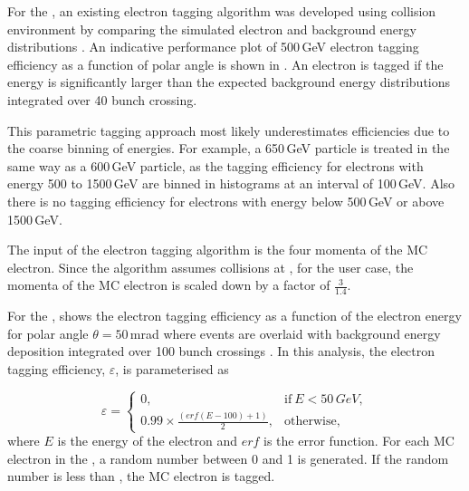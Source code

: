 For the \BeamCAL, an existing electron tagging algorithm was developed using  collision environment by comparing the simulated electron and background energy distributions \cite{Sailer:2017onh}. An indicative performance plot of 500\,GeV electron tagging efficiency as a function of polar angle is shown in . An electron is tagged if the energy is significantly larger than the expected background energy distributions integrated over 40 bunch crossing.

This parametric tagging approach  most likely underestimates efficiencies due to the coarse binning of energies. For example,  a 650\,GeV particle is treated in the same way as a 600\,GeV particle, as the tagging efficiency for electrons with energy 500 to 1500\,GeV are binned in histograms at an interval of 100\,GeV. Also there is no tagging efficiency for electrons with energy below 500\,GeV or above 1500\,GeV.



The input of the \BeamCAL electron tagging algorithm is the four momenta of the MC electron. Since the algorithm assumes collisions at , for the  user case, the momenta of the MC electron is scaled down by a factor of $\frac{3}{1.4}$.



For the \LumiCAL,   shows the \LumiCAL  electron tagging efficiency as a function of the electron energy for polar angle $\theta = 50$\,mrad where events are overlaid with background energy deposition integrated over 100 bunch crossings \cite{Lukic:forwardElectron}. In this analysis, the \LumiCAL electron tagging efficiency, $\varepsilon$, is parameterised as




\begin{equation}
\varepsilon=
\begin{cases}
  0, & \text{if}\ E < 50\,GeV,\\
  0.99 \times \frac{(erf(E - 100) + 1 )}{2}, & \text{otherwise},
\end{cases}
\end{equation}
where $E$ is the energy of the electron and $erf$ is the error function. For each MC electron in the \LumiCAL, a random number between 0 and 1 is generated. If the random number is less than \varepsilon, the MC electron is tagged.

